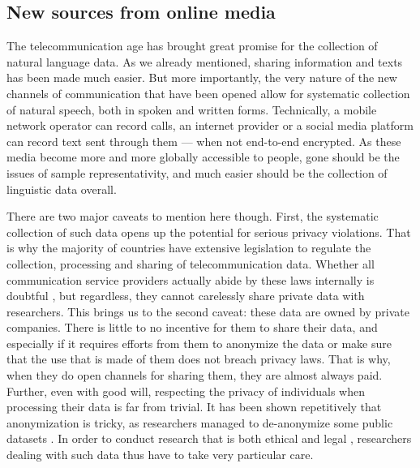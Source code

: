 \documentclass[../thesis.tex]{subfiles}
\begin{document}
\subsection{New sources from online media}
The telecommunication age has brought great promise for the collection of natural
language data. As we already mentioned, sharing information and texts has been made much
easier. But more importantly, the very nature of the new channels of
communication that have been opened allow for systematic collection of natural speech,
both in spoken and written forms. Technically, a mobile network operator can record
calls, an internet provider or a social media platform can record text sent through them
--- when not end-to-end encrypted. As these media become more and more globally
accessible to people, gone should be the issues of sample representativity, and much
easier should be the collection of linguistic data overall.

There are two major caveats to mention here though. First, the systematic collection of
such data opens up the potential for serious privacy violations. That is why the
majority of countries have extensive legislation to regulate the collection, processing
and sharing of telecommunication data. Whether all communication service providers
actually abide by these laws internally is doubtful
\cite{GDPREnforcement,GDPRFines2023}, but regardless, they cannot carelessly share
private data with researchers. This brings us to the second caveat: these data are owned
by private companies. There is little to no incentive for them to share their data, and
especially if it requires efforts from them to anonymize the data or make sure that the
use that is made of them does not breach privacy laws. That is why, when they do open
channels for sharing them, they are almost always paid. Further, even with good will,
respecting the privacy of individuals when processing their data is far from trivial. It
has been shown repetitively that anonymization is tricky, as researchers managed
to de-anonymize some public datasets
\cite{NarayananRobustDeanonymization2008,GambsDeanonymizationAttack2014}. In order to
conduct research that is both ethical and legal
\cite{OhmBrokenPromises2009a,KulkBraveNew2012}, researchers dealing with such data thus
have to take very particular care.
\end{document}
